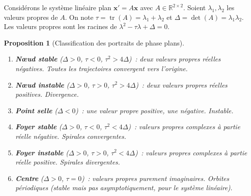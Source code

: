 \documentclass[12pt,a4paper,openany]{book}
\theoremstyle{definition}
\theoremstyle{plain}
\newtheorem{proposition}[definition]{Proposition}
\theoremstyle{remark}
\newcommand{\R}{\mathbb{R}}
\DeclareMathOperator{\tr}{tr}
\begin{document}
Considérons le système linéaire plan $\mathbf{x}'=A\mathbf{x}$ avec
$A\in\R^{2\times 2}$. Soient $\lambda_1,\lambda_2$ les valeurs propres
de $A$. On note $\tau=\tr(A)=\lambda_1+\lambda_2$ et
$\Delta=\det(A)=\lambda_1\lambda_2$. Les valeurs propres sont les
racines de $\lambda^2-\tau\lambda+\Delta=0$.

\begin{proposition}[Classification des portraits de phase plans]\label{prop:classif-phase}
  \begin{enumerate}[label=\textbf{(\arabic*)}]
    \item \textbf{N\oe ud stable} ($\Delta>0$,
      $\tau<0$, $\tau^2>4\Delta$)~: deux valeurs propres réelles
      négatives. Toutes les trajectoires convergent vers l'origine.
    \item \textbf{N\oe ud instable} ($\Delta>0$,
      $\tau>0$, $\tau^2>4\Delta$)~: deux valeurs propres réelles
      positives. Divergence.
    \item \textbf{Point selle} ($\Delta<0$)~:
      une valeur propre positive, une négative. Instable.
    \item \textbf{Foyer stable} ($\Delta>0$,
      $\tau<0$, $\tau^2<4\Delta$)~: valeurs propres complexes à
      partie réelle négative. Spirales convergentes.
    \item \textbf{Foyer instable} ($\Delta>0$,
      $\tau>0$, $\tau^2<4\Delta$)~: valeurs propres complexes à
      partie réelle positive. Spirales divergentes.
    \item \textbf{Centre} ($\Delta>0$, $\tau=0$)~:
      valeurs propres purement imaginaires. Orbites périodiques
      (stable mais pas asymptotiquement, pour le système linéaire).
  \end{enumerate}
\end{proposition}
\end{document}
